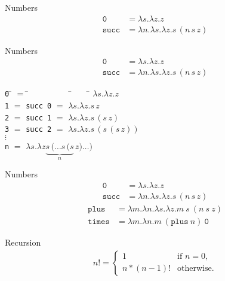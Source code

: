 \documentclass{beamer}
\newcommand{\sym}[1]{\texttt{#1}}
\newcommand{\msym}[1]{\mathtt{#1}}
\newcommand{\centeredtab}[1]{\begin{center}\parbox{0cm}{\begin{tabbing}#1\end{tabbing}}\end{center}}
\begin{document}
\begin{frame}{Numbers}
\begin{align*}
\msym{0}    &= \lambda s.\lambda z.z \\
\msym{succ} &= \lambda n.\lambda s.\lambda z.s\,(n\,s\,z)
\end{align*}
\end{frame}
\begin{frame}{Numbers}
\begin{align*}
\msym{0}    &= \lambda s.\lambda z.z \\
\msym{succ} &= \lambda n.\lambda s.\lambda z.s\,(n\,s\,z)
\end{align*}
\centeredtab{
\sym{0} \= $=$ \= ~~~~~~~~~    \= ~~~ \= $\lambda s.\lambda z.z$    \\
\sym{1} \> $=$ \> \sym{succ 0} \> $=$ \> $\lambda s.\lambda z.s\,z$ \\
\sym{2} \> $=$ \> \sym{succ 1} \> $=$ \> $\lambda s.\lambda z.s\,(s\,z)$ \\
\sym{3} \> $=$ \> \sym{succ 2} \> $=$ \> $\lambda s.\lambda z.s\,(s\,(s\,z))$ \\
$\vdots$ \\
\sym{n} \> $=$ \> \> \> $\lambda s.\lambda z\underbrace{s\,(\dots s\,(s}_n\,z)\dots)$
}
\end{frame}
\begin{frame}{Numbers}
\begin{align*}
\msym{0}    &= \lambda s.\lambda z.z \\
\msym{succ} &= \lambda n.\lambda s.\lambda z.s\,(n\,s\,z)
\end{align*}
\begin{align*}
\msym{plus}  &= \lambda m.\lambda n.\lambda s. \lambda z.m\ s\ (n\ s\ z) \\
\msym{times} &= \lambda m.\lambda n.m\ (\msym{plus}\ n)\ \msym{0}
\end{align*}
\end{frame}
\begin{frame}{Recursion}
\begin{align*}
n!=\begin{cases}
    1 & \text{if $n=0$},\\
    n*(n-1)! & \text{otherwise}.
  \end{cases}
\end{align*}
\end{frame}
\end{document}
